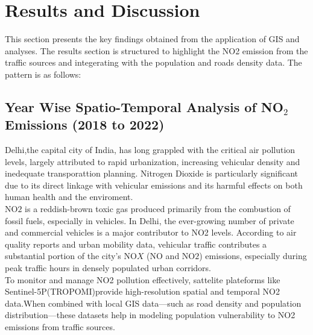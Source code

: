\documentclass[12pt]{report}
\begin{document}
\chapter{Results and Discussion}
This section presents the key findings obtained from the application of GIS and analyses. The results section is structured to highlight the NO2 emission from the traffic sources and integerating with the population and roads density data. The pattern is as follows:
\section{Year Wise Spatio-Temporal Analysis of NO$_2$ Emissions (2018 to 2022)}
Delhi,the capital city of India, has long grappled with the critical air pollution levels, largely attributed to rapid urbanization, increasing vehicular density and inedequate transporattion planning. Nitrogen Dioxide is particularly significant due to its direct linkage with vehicular emissions and its harmful effects on both human health and the enviroment.\\
NO$2$ is a reddish-brown toxic gas produced primarily from the combustion of fossil fuels, especially in vehicles. In Delhi, the ever-growing number of private and commercial vehicles is a major contributor to NO2 levels. According to air quality reports and urban mobility data, vehicular traffic contributes a substantial portion of the city's NO$X$ (NO and NO$2$) emissions, especially during peak traffic hours in densely populated urban corridors.\\
To monitor and manage NO2 pollution effectively, sattelite plateforms like Sentinel-5P(TROPOMI)provide high-resolution spatial and temporal NO2 data.When combined with local GIS data—such as road density and population distribution—these datasets help in modeling population vulnerability to NO2 emissions from traffic sources.
\end{document}
